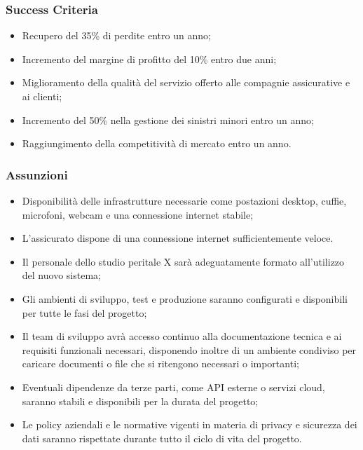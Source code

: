 \documentclass[a4paper,12pt, openright]{report}
\begin{document}
\subsubsection{Success Criteria}
\begin{itemize}
    \item Recupero del 35\% di perdite entro un anno;
    \item Incremento del margine di profitto del 10\% entro due anni;
    \item Miglioramento della qualità del servizio offerto alle compagnie assicurative e ai clienti;
    \item Incremento del 50\% nella gestione dei sinistri minori entro un anno;
    \item Raggiungimento della competitività di mercato entro un anno.
\end{itemize}

\subsubsection{Assunzioni}
\begin{itemize}
    \item Disponibilità delle infrastrutture necessarie come postazioni desktop, cuffie, microfoni, webcam e una connessione internet stabile;
    \item L'assicurato dispone di una connessione internet sufficientemente veloce.
    \item Il personale dello studio peritale X sarà adeguatamente formato all'utilizzo del nuovo sistema;
    \item Gli ambienti di sviluppo, test e produzione saranno configurati e disponibili per tutte le fasi del progetto;
    \item Il team di sviluppo avrà accesso continuo alla documentazione tecnica e ai requisiti funzionali necessari, disponendo inoltre di un ambiente condiviso per caricare documenti o file che si ritengono necessari o importanti;
    \item Eventuali dipendenze da terze parti, come API esterne o servizi cloud, saranno stabili e disponibili per la durata del progetto;
    \item Le policy aziendali e le normative vigenti in materia di privacy e sicurezza dei dati saranno rispettate durante tutto il ciclo di vita del progetto.
\end{itemize} 
\end{document}
